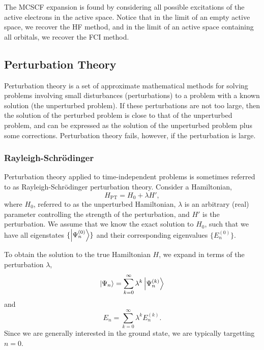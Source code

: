 The MCSCF expansion is found by considering all possible excitations of the active electrons in the active space. Notice that in the limit of an empty active space, we recover the \gls{HF} method, and in the limit of an active space containing all orbitals, we recover the \gls{FCI} method.



\subsection{Perturbation Theory}
\label{sec:perturbation-theory}

Perturbation theory is a set of approximate mathematical methods for solving problems involving small disturbances (perturbations) to a problem with a known solution (the unperturbed problem). If these perturbations are not too large, then the solution of the perturbed problem is close to that of the unperturbed problem, and can be expressed as the solution of the unperturbed problem plus some corrections. Perturbation theory fails, however, if the perturbation is large.

\subsubsection{Rayleigh-Schr\"odinger}

Perturbation theory applied to time-independent problems is sometimes referred to as Rayleigh-Schr\"odinger perturbation theory.\cite{sakuraiModern2017,rayleighTheory1945,schrodingerQuantisierung1926} Consider a Hamiltonian,
\begin{equation}
H_\mathrm{PT} = H_0 + \lambda H',
\end{equation}
where $H_0$, referred to as the unperturbed Hamiltonian, $\lambda$ is an arbitrary (real) parameter controlling the strength of the perturbation, and $H'$ is the perturbation. We assume that we know the exact solution to $H_0$, such that we have all eigenstates $\{\ket{\Psi_n^{(0)}}\}$ and their corresponding eigenvalues $\{E_n^{(0)} \}$.

To obtain the solution to the true Hamiltonian $H$, we expand in terms of the perturbation $\lambda$,
\begin{equation}
\ket{\Psi_n} = \sum_{k=0}^\infty \lambda^k\ket{\Psi_n^{(k)}}
\end{equation}
and
\begin{equation}
E_n = \sum_{k=0}^\infty \lambda^kE_n^{(k)}.
\end{equation}
Since we are generally interested in the ground state, we are typically targetting $n=0$.

